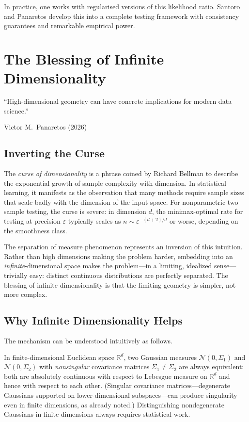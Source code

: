 \documentclass[12pt, oneside]{book}
\theoremstyle{plain}
\theoremstyle{definition}
\newcommand{\R}{\mathbb{R}}
\newcommand{\calN}{\mathcal{N}}
\begin{document}
In practice, one works with regularised versions of this likelihood ratio. Santoro and Panaretos \cite{SantoroPanaretos2025} develop this into a complete testing framework with consistency guarantees and remarkable empirical power.

\chapter{The Blessing of Infinite Dimensionality}
\label{chap:blessing}

\epigraph{``High-dimensional geometry can have concrete implications for modern data science.''}%
{Victor M.\ Panaretos (2026)}

\section{Inverting the Curse}

The \emph{curse of dimensionality} is a phrase coined by Richard Bellman to describe the exponential growth of sample complexity with dimension. In statistical learning, it manifests as the observation that many methods require sample sizes that scale badly with the dimension of the input space. For nonparametric two-sample testing, the curse is severe: in dimension $d$, the minimax-optimal rate for testing at precision $\varepsilon$ typically scales as $n \sim \varepsilon^{-(d+2)/d}$ or worse, depending on the smoothness class.

The separation of measure phenomenon represents an inversion of this intuition. Rather than high dimensions making the problem harder, embedding into an \emph{infinite}-dimensional space makes the problem---in a limiting, idealized sense---trivially easy: distinct continuous distributions are perfectly separated. The blessing of infinite dimensionality is that the limiting geometry is simpler, not more complex.

\section{Why Infinite Dimensionality Helps}

The mechanism can be understood intuitively as follows.

In finite-dimensional Euclidean space $\R^d$, two Gaussian measures $\calN(0, \Sigma_1)$ and $\calN(0, \Sigma_2)$ with \emph{nonsingular} covariance matrices $\Sigma_1 \neq \Sigma_2$ are always equivalent: both are absolutely continuous with respect to Lebesgue measure on $\R^d$ and hence with respect to each other. (Singular covariance matrices---degenerate Gaussians supported on lower-dimensional subspaces---can produce singularity even in finite dimensions, as already noted.) Distinguishing nondegenerate Gaussians in finite dimensions always requires statistical work.
\end{document}
